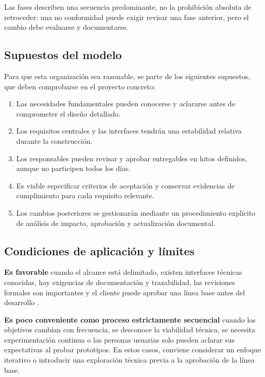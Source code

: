 Las fases describen una secuencia predominante, no la prohibición absoluta
de retroceder: una no conformidad puede exigir revisar una fase anterior,
pero el cambio debe evaluarse y documentarse.

\subsection{Supuestos del modelo}
Para que esta organización sea razonable, se parte de los siguientes
supuestos, que deben comprobarse en el proyecto concreto:
\begin{enumerate}
  \item Las necesidades fundamentales pueden conocerse y aclararse antes
  de comprometer el diseño detallado.
  \item Los requisitos centrales y las interfaces tendrán una estabilidad
  relativa durante la construcción.
  \item Los responsables pueden revisar y aprobar entregables en hitos
  definidos, aunque no participen todos los días.
  \item Es viable especificar criterios de aceptación y conservar
  evidencias de cumplimiento para cada requisito relevante.
  \item Los cambios posteriores se gestionarán mediante un procedimiento
  explícito de análisis de impacto, aprobación y actualización documental.
\end{enumerate}

\subsection{Condiciones de aplicación y límites}
\textbf{Es favorable} cuando el alcance está delimitado, existen interfaces
técnicas conocidas, hay exigencias de documentación y trazabilidad, las
revisiones formales son importantes y el cliente puede aprobar una línea
base antes del desarrollo \cite{swebok2024}.

\textbf{Es poco conveniente como proceso estrictamente secuencial} cuando
los objetivos cambian con frecuencia, se desconoce la viabilidad técnica,
se necesita experimentación continua o las personas usuarias solo pueden
aclarar sus expectativas al probar prototipos. En estos casos, conviene
considerar un enfoque iterativo o introducir una exploración técnica
previa a la aprobación de la línea base.


